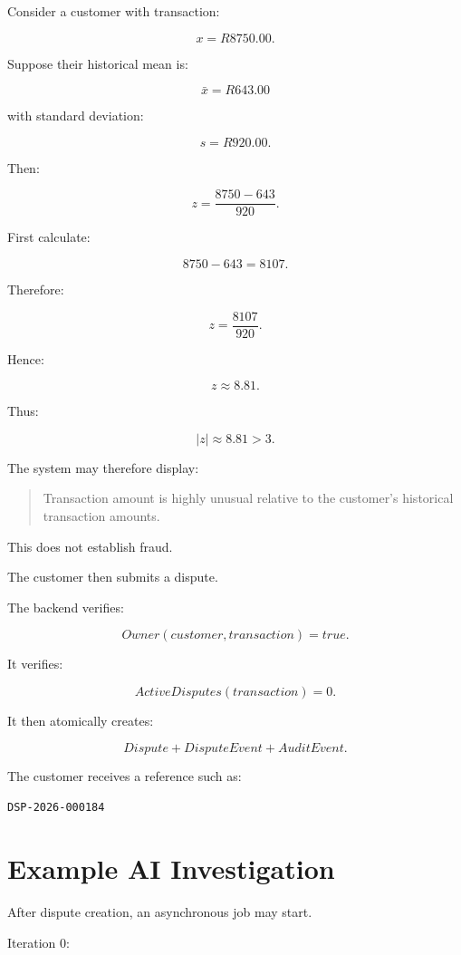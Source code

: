 \documentclass[11pt,a4paper]{article}
\begin{document}
Consider a customer with transaction:

\[
x = R8750.00.
\]

Suppose their historical mean is:

\[
\bar{x}=R643.00
\]

with standard deviation:

\[
s=R920.00.
\]

Then:

\[
z
=
\frac{8750-643}{920}.
\]

First calculate:

\[
8750-643=8107.
\]

Therefore:

\[
z
=
\frac{8107}{920}.
\]

Hence:

\[
z
\approx8.81.
\]

Thus:

\[
|z|\approx8.81>3.
\]

The system may therefore display:

\begin{quote}
Transaction amount is highly unusual relative to the customer's
historical transaction amounts.
\end{quote}

This does not establish fraud.

The customer then submits a dispute.

The backend verifies:

\[
Owner(customer,transaction)=true.
\]

It verifies:

\[
ActiveDisputes(transaction)=0.
\]

It then atomically creates:

\[
Dispute
+
DisputeEvent
+
AuditEvent.
\]

The customer receives a reference such as:

\begin{center}
\texttt{DSP-2026-000184}
\end{center}

\section{Example AI Investigation}

After dispute creation, an asynchronous job may start.

Iteration \(0\):
\end{document}
